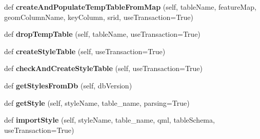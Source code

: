 \begin{DoxyCompactItemize}
def {\bfseries create\+And\+Populate\+Temp\+Table\+From\+Map} (self, table\+Name, feature\+Map, geom\+Column\+Name, key\+Column, srid, use\+Transaction=True)
\item 
\mbox{\label{class_dsg_tools_1_1_factories_1_1_db_factory_1_1postgis_db_1_1_postgis_db_a2ca9f3847ed354dc418e59677e2d4623}} 
def {\bfseries drop\+Temp\+Table} (self, table\+Name, use\+Transaction=True)
\item 
\mbox{\label{class_dsg_tools_1_1_factories_1_1_db_factory_1_1postgis_db_1_1_postgis_db_a209d5fbb87803a897bc2bb24d7bfecb7}} 
def {\bfseries create\+Style\+Table} (self, use\+Transaction=True)
\item 
\mbox{\label{class_dsg_tools_1_1_factories_1_1_db_factory_1_1postgis_db_1_1_postgis_db_aab399c3260e0fa1525815dc34913b533}} 
def {\bfseries check\+And\+Create\+Style\+Table} (self, use\+Transaction=True)
\item 
\mbox{\label{class_dsg_tools_1_1_factories_1_1_db_factory_1_1postgis_db_1_1_postgis_db_ad0de5b485a9e6b6588effb01e62f78c9}} 
def {\bfseries get\+Styles\+From\+Db} (self, db\+Version)
\item 
\mbox{\label{class_dsg_tools_1_1_factories_1_1_db_factory_1_1postgis_db_1_1_postgis_db_a5d53d1d3539ddb15e426b96a274c059f}} 
def {\bfseries get\+Style} (self, style\+Name, table\+\_\+name, parsing=True)
\item 
\mbox{\label{class_dsg_tools_1_1_factories_1_1_db_factory_1_1postgis_db_1_1_postgis_db_a34de40437bc07c0555492b527dbce9d3}} 
def {\bfseries import\+Style} (self, style\+Name, table\+\_\+name, qml, table\+Schema, use\+Transaction=True)
\item 
\mbox{\label{class_dsg_tools_1_1_factories_1_1_db_factory_1_1postgis_db_1_1_postgis_db_aa9c9f7a5a1b9da94ba15090dfceb733c}} 

\end{DoxyCompactItemize}
